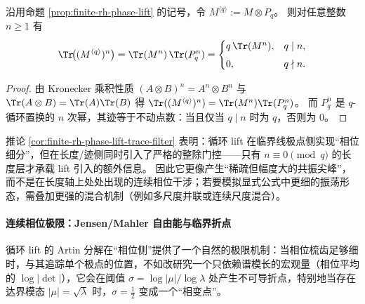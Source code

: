\begin{corollary}\label{cor:finite-rh-phase-lift-trace-filter}
沿用命题 \ref{prop:finite-rh-phase-lift} 的记号，令 \(M^{\langle q\rangle}:=M\otimes P_q\)。
则对任意整数 \(n\ge 1\) 有
\[
\Tr\!\bigl((M^{\langle q\rangle})^{n}\bigr)
=\Tr(M^n)\,\Tr(P_q^n)
=
\begin{cases}
q\,\Tr(M^n), & q\mid n,\\[4pt]
0, & q\nmid n.
\end{cases}
\]
\end{corollary}
\begin{proof}
由 Kronecker 乘积性质 \((A\otimes B)^n=A^n\otimes B^n\) 与 \(\Tr(A\otimes B)=\Tr(A)\Tr(B)\) 得
\(\Tr((M^{\langle q\rangle})^n)=\Tr(M^n)\Tr(P_q^n)\)。
而 \(P_q^n\) 是 \(q\)-循环置换的 \(n\) 次幂，其迹等于不动点数：当且仅当 \(q\mid n\) 时为 \(q\)，否则为 \(0\)。
\end{proof}

\begin{remark}[机制含义：相位梳齿 \texorpdfstring{$\neq$}{!=} 相位混合]\label{rem:finite-rh-phase-lift-divisibility-filter}
推论 \ref{cor:finite-rh-phase-lift-trace-filter} 表明：循环 lift 在临界线极点侧实现“相位细分”，但在长度/迹侧同时引入了严格的整除门控——只有 \(n\equiv 0\pmod q\) 的长度层才承载 lift 引入的额外信息。
因此它更像产生“稀疏但幅度大的共振尖峰”，而不是在长度轴上处处出现的连续相位干涉；若要模拟显式公式中更细的振荡形态，需叠加更强的混合机制（例如多尺度并联或连续尺度混合）。
\end{remark}

\paragraph{连续相位极限：Jensen/Mahler 自由能与临界折点}\label{par:finite-rh-jensen-free-energy}
循环 lift 的 Artin 分解在“相位侧”提供了一个自然的极限机制：当相位梳齿足够细时，与其追踪单个极点的位置，不如改研究一个只依赖谱模长的宏观量（相位平均的 \(\log|\det|\)），它会在阈值
\(\sigma=\log|\mu|/\log\lambda\)
处产生不可导折点，特别地当存在达界模态 \(|\mu|=\sqrt{\lambda}\) 时，\(\sigma=\tfrac12\) 变成一个“相变点”。


